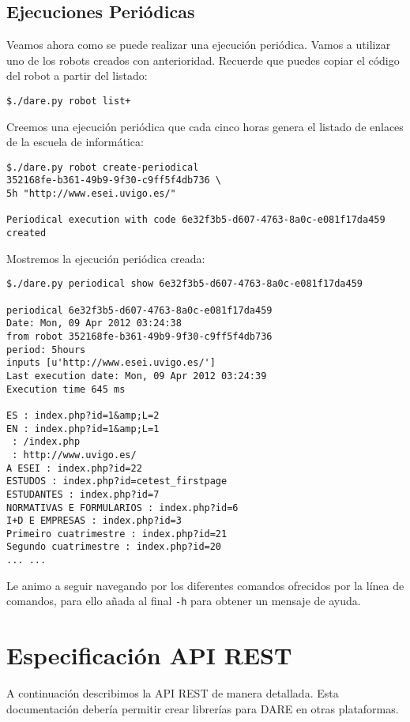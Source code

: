 \subsection{Ejecuciones Periódicas}

Veamos ahora como se puede realizar una ejecución periódica. Vamos a
utilizar uno de los robots creados con anterioridad. Recuerde que
puedes copiar el código del robot a partir del listado:

\begin{verbatim}
$./dare.py robot list+
\end{verbatim}

Creemos una ejecución periódica que cada cinco horas genera el listado
de enlaces de la escuela de informática:

\begin{verbatim}
$./dare.py robot create-periodical
352168fe-b361-49b9-9f30-c9ff5f4db736 \
5h "http://www.esei.uvigo.es/"

Periodical execution with code 6e32f3b5-d607-4763-8a0c-e081f17da459 created
\end{verbatim}

Mostremos la ejecución periódica creada:

\begin{verbatim}
$./dare.py periodical show 6e32f3b5-d607-4763-8a0c-e081f17da459

periodical 6e32f3b5-d607-4763-8a0c-e081f17da459
Date: Mon, 09 Apr 2012 03:24:38
from robot 352168fe-b361-49b9-9f30-c9ff5f4db736
period: 5hours
inputs [u'http://www.esei.uvigo.es/']
Last execution date: Mon, 09 Apr 2012 03:24:39
Execution time 645 ms

ES : index.php?id=1&amp;L=2
EN : index.php?id=1&amp;L=1
 : /index.php
 : http://www.uvigo.es/
A ESEI : index.php?id=22
ESTUDOS : index.php?id=cetest_firstpage
ESTUDANTES : index.php?id=7
NORMATIVAS E FORMULARIOS : index.php?id=6
I+D E EMPRESAS : index.php?id=3
Primeiro cuatrimestre : index.php?id=21
Segundo cuatrimestre : index.php?id=20
... ...
\end{verbatim}

Le animo a seguir navegando por los diferentes comandos ofrecidos por
la línea de comandos, para ello añada al final \verb+-h+ para obtener
un mensaje de ayuda.

\section{Especificación API REST}

A continuación describimos la API REST de manera detallada. Esta
documentación debería permitir crear librerías para DARE en otras
plataformas.

